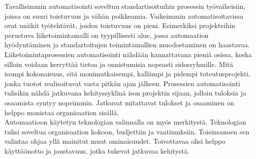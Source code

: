 \documentclass[finnish,12pt,a4paper,pdftex]{article}
\begin{document}
Tavallisimmin automatisointi soveltuu standartisoituihin prosessin työvaiheisiin, joissa on suuri toistuvuus ja vähän poikkeamia. Vaikeimmin automatisoitavissa ovat uniikit työtehtävät, joiden toistuvuus on pieni. Esimerkiksi projekteihin perustuva liiketoimintamalli on tyypillisesti alue, jossa automaation hyödyntäminen ja standartoitujen toimintamallien muodostaminen on haastavaa.  \citep{teollisuustalous}\\

Liiketoimintaprosessien automatisointi nähdään kannattavana pieniä osissa, koska silloin voidaan kerryttää tietoa ja onnistumisia nopeasti sidosryhmille. Mitä isompi kokonaisuus, sitä monimutkaisempi, kalliimpi ja pidempi toteutusprojekti, jonka tuotot realisoituvat vasta pitkän ajan jälkeen. Prosessien automatisointi tulisikin nähdä jatkuvana kehityssyklinä ison projektin sijaan, jolloin tuloksia ja osaamista syntyy nopeimmin. Jatkuvat mitattavat tulokset ja osaaminen on helppo monistaa organisaation sisällä. \citep{clarkin}\\

Automaatioon käytetyn teknologian valinnalla on myös merkitystä. Teknologian tulisi soveltua organisaation kokoon, budjettiin ja vaatimuksiin. Toisinsanoen sen valintaa ohjaa yllä mainitut muut ominaisuudet. Toivottavaa olisi helppo käyttöönotto ja joustavuus, jotka tukevat jatkuvaa kehitystä. \citep{mohapatra}




\end{document}
